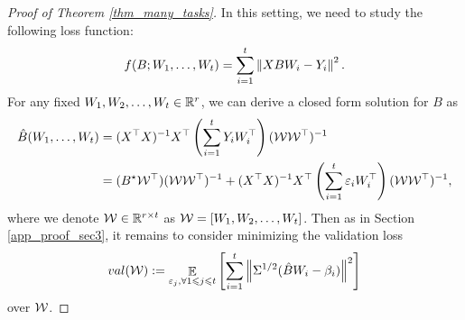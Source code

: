 \begin{proof}[Proof of Theorem \ref{thm_many_tasks}]
In this setting, we need to study the following loss function:
\begin{align}
	f(B; W_1, \dots, W_t) = \sum_{i=1}^t \bignorm{X B W_i - Y_i}^2. \label{eq_mtl_same_cov}
\end{align}
For any fixed $W_1, W_2, \dots, W_t \in \R^r$, we can derive a closed form solution for $B$ as
	\begin{align*}
		\hat{B}(W_1, \dots, W_t) &= (X^{\top}X)^{-1} X^{\top} \bigbrace{\sum_{i=1}^t Y_i W_i^{\top}} (\cal W  \cal W^{\top})^{-1} \\
		&= (B^\star \cal W ^{\top}) (\cal W \cal W ^{\top})^{-1} + (X^{\top}X)^{-1}X^{\top} \bigbrace{\sum_{i=1}^t \varepsilon_i W_i^{\top}} (\cal W \cal W^{\top})^{-1},
	\end{align*}
	where we denote $\cal W \in\real^{r\times t}$ as $\cal W=[W_1, W_2, \dots, W_t]$.
	\cor Then as in Section \ref{app_proof_sec3}, it remains to consider minimizing the validation loss 
	$$\val( \cal W):=\exarg{\varepsilon_j, \forall 1\le j\le t}{ \sum_{i=1}^t \bignorm{\Sigma^{1/2}( \hat B W_i - \beta_i)}^2}$$ 
	over $\cal W$. \nc


\end{proof}
